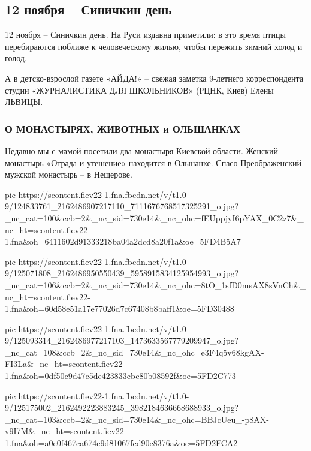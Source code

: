  
 
 

\subsection{12 ноября – Синичкин день}


12 ноября – Синичкин день. На Руси издавна приметили: в это время птицы
перебираются поближе к человеческому жилью, чтобы пережить зимний холод и
голод.

А в детско-взрослой газете «АЙДА!» -- свежая заметка 9-летнего корреспондента
студии «ЖУРНАЛИСТИКА ДЛЯ ШКОЛЬНИКОВ» (РЦНК, Киев) Елены ЛЬВИЦЫ.

\subsubsection{О МОНАСТЫРЯХ, ЖИВОТНЫХ и ОЛЬШАНКАХ}

Недавно мы с мамой посетили два монастыря Киевской области. Женский монастырь
«Отрада и утешение» находится в Ольшанке. Спасо-Преображенский мужской
монастырь -- в Нещерове.

\ifcmt
pic https://scontent.fiev22-1.fna.fbcdn.net/v/t1.0-9/124833761_2162486907217110_7111676768517325291_o.jpg?_nc_cat=100&ccb=2&_nc_sid=730e14&_nc_ohc=fEUppjyI6pYAX_0C2z7&_nc_ht=scontent.fiev22-1.fna&oh=6411602d91333218ba04a2dcd8a20f1a&oe=5FD4B5A7

pic https://scontent.fiev22-1.fna.fbcdn.net/v/t1.0-9/125071808_2162486950550439_5958915834125954993_o.jpg?_nc_cat=106&ccb=2&_nc_sid=730e14&_nc_ohc=8tO_1sfD0msAX8sVnCh&_nc_ht=scontent.fiev22-1.fna&oh=60d58e51a17e77026d7c67408b8baff1&oe=5FD30488

pic https://scontent.fiev22-1.fna.fbcdn.net/v/t1.0-9/125093314_2162486977217103_1473633567779209947_o.jpg?_nc_cat=108&ccb=2&_nc_sid=730e14&_nc_ohc=e3F4q5v68kgAX-FI3La&_nc_ht=scontent.fiev22-1.fna&oh=0df50c9d47c5de423833cbc80b08592f&oe=5FD2C773

pic https://scontent.fiev22-1.fna.fbcdn.net/v/t1.0-9/125175002_2162492223883245_3982184636668688933_o.jpg?_nc_cat=103&ccb=2&_nc_sid=730e14&_nc_ohc=BBJcUeu_-p8AX-v9I7M&_nc_ht=scontent.fiev22-1.fna&oh=a0e0f467ca674e9d81067fcd90c8376a&oe=5FD2FCA2
\fi

